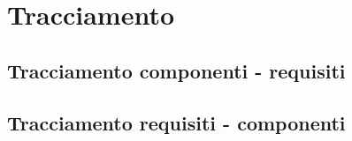 \section{Tracciamento}

	\subsection{Tracciamento componenti - requisiti}
	
	\subsection{Tracciamento requisiti - componenti}
